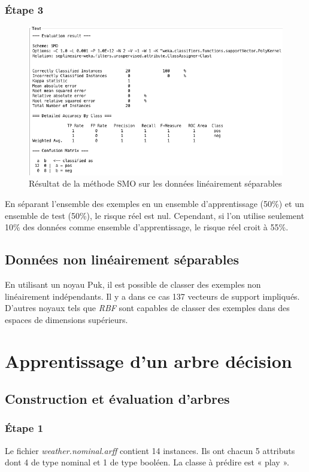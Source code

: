 \documentclass[a4paper,12pt]{article}
\begin{document}
\subsubsection*{\'Etape 3}
\begin{figure}
	\center
	\includegraphics[width=1\textwidth]{SVM-table.png}
	\caption{Résultat de la méthode SMO sur les données linéairement séparables}
	\label{fig:svm-table}
\end{figure}
En séparant l’ensemble des exemples en un ensemble d’apprentissage (50\%) et un ensemble de test (50\%), le risque réel est nul.
Cependant, si l’on utilise seulement 10\% des données comme ensemble d’apprentissage, le risque réel croit à 55\%.


\subsection{Données non linéairement séparables}

En utilisant un noyau Puk, il est possible de classer des exemples non linéairement indépendants. Il y a dans ce cas 137 vecteurs de support impliqués. D'autres noyaux tels que \textit{RBF} sont capables de classer des exemples dans des espaces de dimensions supérieurs.

\section{Apprentissage d'un arbre décision}


\subsection{Construction et évaluation d'arbres}

\subsubsection*{\'Etape 1}
Le fichier \textit{weather.nominal.arff} contient 14 instances.
Ils ont chacun 5 attributs dont 4 de type nominal et 1 de type booléen.
La classe à prédire est « play ».
\end{document}
